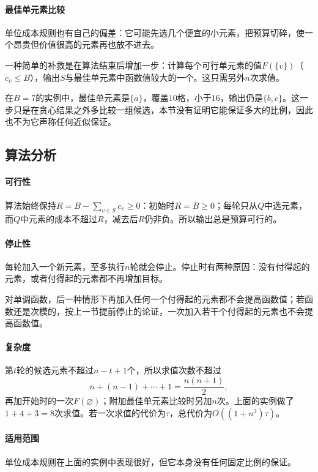 \paragraph{最佳单元素比较}
单位成本规则也有自己的偏差：它可能先选几个便宜的小元素，把预算切碎，使一个昂贵但价值很高的元素再也放不进去。

一种简单的补救是在算法结束后增加一步：计算每个可行单元素的值$F(\{v\})$（$c_v\leq B$），输出$S$与最佳单元素中函数值较大的一个。这只需另外$n$次求值。

在$B=7$的实例中，最佳单元素是$\{a\}$，覆盖$10$格，小于$16$，输出仍是$\{b,c\}$。这一步只是在贪心结果之外多比较一组候选，本节没有证明它能保证多大的比例，因此也不为它声称任何近似保证。

\subsection{算法分析}
\label{sec:graph-setfn-budget-limits}

\paragraph{可行性}
算法始终保持$R=B-\sum_{v\in S}c_v\geq0$：初始时$R=B\geq0$；每轮只从$Q$中选元素，而$Q$中元素的成本不超过$R$，减去后$R$仍非负。所以输出总是预算可行的。

\paragraph{停止性}
每轮加入一个新元素，至多执行$n$轮就会停止。停止时有两种原因：没有付得起的元素，或者付得起的元素都不再增加目标。

对单调函数，后一种情形下再加入任何一个付得起的元素都不会提高函数值；若函数还是次模的，按上一节提前停止的论证，一次加入若干个付得起的元素也不会提高函数值。

\paragraph{复杂度}
第$t$轮的候选元素不超过$n-t+1$个，所以求值次数不超过
\[
  n+(n-1)+\cdots+1=\frac{n(n+1)}{2},
\]
再加开始时的一次$F(\varnothing)$；附加最佳单元素比较时另加$n$次。上面的实例做了$1+4+3=8$次求值。若一次求值的代价为$\tau$，总代价为$O((1+n^2)\tau)$。

\paragraph{适用范围}
单位成本规则在上面的实例中表现很好，但它本身没有任何固定比例的保证。

